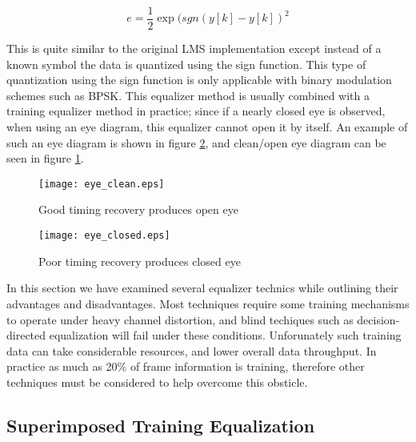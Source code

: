 \begin{equation}\label{dd_eq}
e = \frac{1}{2}\exp{(sgn(y[k]-y[k])^{2}}
\end{equation}

This is quite similar to the original LMS implementation except instead of a known symbol the data is quantized using the sign function.  This type of quantization using the sign function is only applicable with binary modulation schemes such as BPSK.  This equalizer method is usually combined with a training equalizer method in practice; since if a nearly closed eye is observed, when using an eye diagram, this equalizer cannot open it by itself.  An example of such an eye diagram is shown in figure \ref{eye_closed}, and clean/open eye diagram can be seen in figure \ref{eye_clean}.\\

\begin{figure}\label{eye_clean}
\centering
\texttt{[image: eye\_clean.eps]}
\caption{Good timing recovery produces open eye}
\end{figure}

\begin{figure}\label{eye_closed}
\centering
\texttt{[image: eye\_closed.eps]}
\caption{Poor timing recovery produces closed eye}
\end{figure}

In this section we have examined several equalizer technics while outlining their advantages and disadvantages.  Most techniques require some training mechanisms to operate under heavy channel distortion, and blind techiques such as decision-directed equalization will fail under these conditions.  Unforunately such training data can take considerable resources, and lower overall data throughput.  In practice as much as 20\% of frame information is training, therefore other techniques must be considered to help overcome this obsticle.\\


\subsection{Superimposed Training Equalization}

